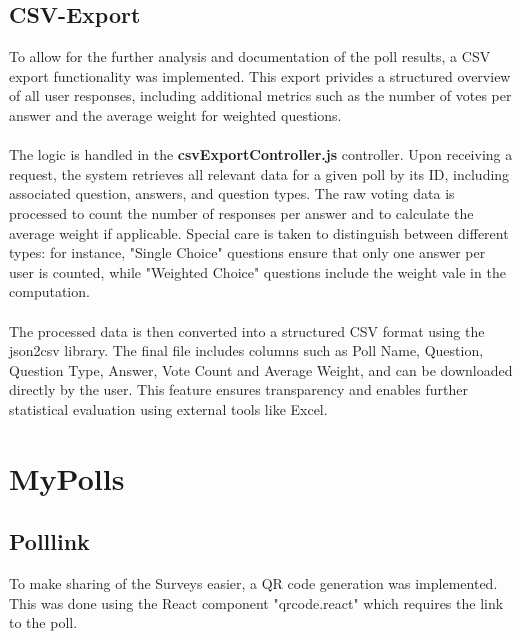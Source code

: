 \documentclass[a4paper,12pt]{report}
\begin{document}
\subsection{CSV-Export}
To allow for the further analysis and documentation of the poll results, a CSV export functionality was implemented. This export privides a structured overview of all user responses, including additional metrics such as the number of votes per answer and the average weight for weighted questions.\\ \\
The logic is handled in the \textbf{csvExportController.js} controller. Upon receiving a request, the system retrieves all relevant data for a given poll by its ID, including associated question, answers, and question types. The raw voting data is processed to count the number of responses per answer and to calculate the average weight if applicable. Special care is taken to distinguish between different types: for instance, "Single Choice" questions ensure that only one answer per user is counted, while "Weighted Choice" questions include the weight vale in the computation.\\ \\
The processed data is then converted into a structured CSV format using the json2csv library. The final file includes columns such as Poll Name, Question, Question Type, Answer, Vote Count and Average Weight, and can be downloaded directly by the user. This feature ensures transparency and enables further statistical evaluation using external tools like Excel.\parencite{json2csv}
\section{MyPolls}
\subsection{Polllink}

To make sharing of the Surveys easier, a QR code generation was implemented. This was done using the React component "qrcode.react" which requires the link to the poll.\parencite{qrcode}
\end{document}
